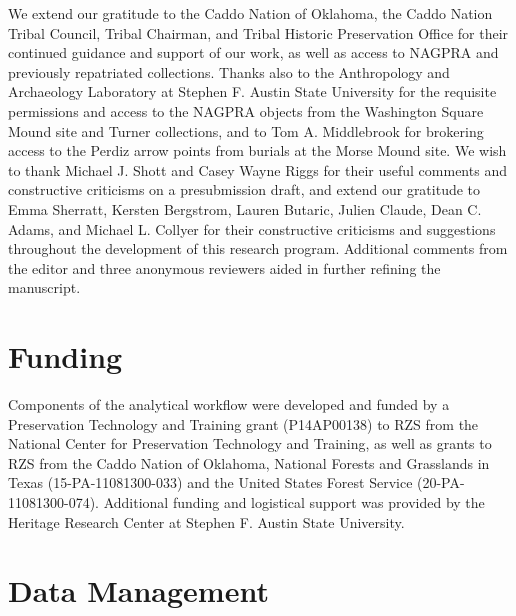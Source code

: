 \documentclass[smallextended]{svjour3}       %
\begin{document}
We extend our gratitude to the Caddo Nation of Oklahoma, the Caddo
Nation Tribal Council, Tribal Chairman, and Tribal Historic Preservation
Office for their continued guidance and support of our work, as well as
access to NAGPRA and previously repatriated collections. Thanks also to
the Anthropology and Archaeology Laboratory at Stephen F. Austin State
University for the requisite permissions and access to the NAGPRA
objects from the Washington Square Mound site and Turner collections,
and to Tom A. Middlebrook for brokering access to the Perdiz arrow
points from burials at the Morse Mound site. We wish to thank Michael J.
Shott and Casey Wayne Riggs for their useful comments and constructive
criticisms on a presubmission draft, and extend our gratitude to Emma
Sherratt, Kersten Bergstrom, Lauren Butaric, Julien Claude, Dean C.
Adams, and Michael L. Collyer for their constructive criticisms and
suggestions throughout the development of this research program.
Additional comments from the editor and three anonymous reviewers aided
in further refining the manuscript.

\hypertarget{funding}{%
\section*{Funding}\label{funding}}

Components of the analytical workflow were developed and funded by a
Preservation Technology and Training grant (P14AP00138) to RZS from the
National Center for Preservation Technology and Training, as well as
grants to RZS from the Caddo Nation of Oklahoma, National Forests and
Grasslands in Texas (15-PA-11081300-033) and the United States Forest
Service (20-PA-11081300-074). Additional funding and logistical support
was provided by the Heritage Research Center at Stephen F. Austin State
University.

\hypertarget{data-management}{%
\section*{Data Management}\label{data-management}}
\end{document}
